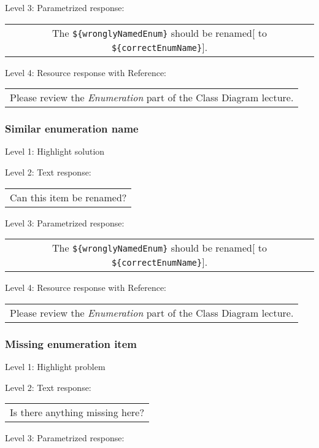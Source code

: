 \noindent Level 3: Parametrized response: \medskip

\begin{tabular}{|c}
The \verb|${wronglyNamedEnum}| should be renamed[ to \verb|${correctEnumName}|].
\end{tabular} \medskip

\noindent Level 4: Resource response with Reference:

\begin{tabular}{|c}
Please review the \textit{Enumeration} part of the Class Diagram lecture.
\end{tabular} \medskip


\subsubsection{Similar enumeration name}

\noindent Level 1: Highlight solution \medskip

\noindent Level 2: Text response: \medskip

\begin{tabular}{|c}
Can this item be renamed?
\end{tabular} \medskip

\noindent Level 3: Parametrized response: \medskip

\begin{tabular}{|c}
The \verb|${wronglyNamedEnum}| should be renamed[ to \verb|${correctEnumName}|].
\end{tabular} \medskip

\noindent Level 4: Resource response with Reference:

\begin{tabular}{|c}
Please review the \textit{Enumeration} part of the Class Diagram lecture.
\end{tabular} \medskip


\subsubsection{Missing enumeration item}

\noindent Level 1: Highlight problem \medskip

\noindent Level 2: Text response: \medskip

\begin{tabular}{|c}
Is there anything missing here?
\end{tabular} \medskip

\noindent Level 3: Parametrized response: \medskip

